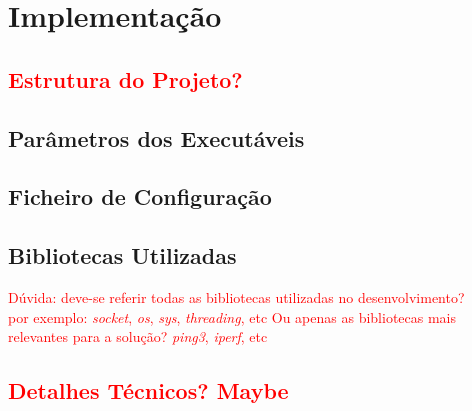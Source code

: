 \documentclass[a4paper,12pt]{scrreprt}
\begin{document}


\chapter{Implementação}

\section{\textcolor{red}{Estrutura do Projeto?}}

\section{Parâmetros dos Executáveis}

\section{Ficheiro de Configuração}

\section{Bibliotecas Utilizadas}

\textcolor{red}{
    Dúvida: deve-se referir todas as bibliotecas utilizadas no desenvolvimento? \\
    por exemplo: \textit{socket}, \textit{os}, \textit{sys}, \textit{threading}, etc
    Ou apenas as bibliotecas mais relevantes para a solução? \textit{ping3}, \textit{iperf}, etc
}

\section{\textcolor{red}{Detalhes Técnicos? Maybe}}


\end{document}
